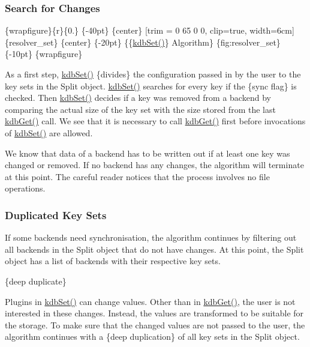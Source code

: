 \subsubsection*{Search for Changes}

\{wrapfigure\}\{r\}\{0.\} \{-\/40pt\} \{center\} \mbox{[}trim = 0 65 0 0, clip=true, width=6cm\mbox{]}\{resolver\+\_\+set\} \{center\} \{-\/20pt\} \{\{\hyperlink{group__kdb_ga11436b058408f83d303ca5e996832bcf}{kdb\+Set()}\} Algorithm\} \{fig\+:resolver\+\_\+set\} \{-\/10pt\} \{wrapfigure\}

As a first step, {\ttfamily \hyperlink{group__kdb_ga11436b058408f83d303ca5e996832bcf}{kdb\+Set()}} \{divides\} the configuration passed in by the user to the key sets in the {\ttfamily Split} object. {\ttfamily \hyperlink{group__kdb_ga11436b058408f83d303ca5e996832bcf}{kdb\+Set()}} searches for every key if the \{sync flag\} is checked. Then {\ttfamily \hyperlink{group__kdb_ga11436b058408f83d303ca5e996832bcf}{kdb\+Set()}} decides if a key was removed from a backend by comparing the actual size of the key set with the size stored from the last {\ttfamily \hyperlink{group__kdb_ga28e385fd9cb7ccfe0b2f1ed2f62453a1}{kdb\+Get()}} call. We see that it is necessary to call {\ttfamily \hyperlink{group__kdb_ga28e385fd9cb7ccfe0b2f1ed2f62453a1}{kdb\+Get()}} first before invocations of {\ttfamily \hyperlink{group__kdb_ga11436b058408f83d303ca5e996832bcf}{kdb\+Set()}} are allowed.

We know that data of a backend has to be written out if at least one key was changed or removed. If no backend has any changes, the algorithm will terminate at this point. The careful reader notices that the process involves no file operations.

\subsubsection*{Duplicated Key Sets}

If some backends need synchronisation, the algorithm continues by filtering out all backends in the {\ttfamily Split} object that do not have changes. At this point, the {\ttfamily Split} object has a list of backends with their respective key sets.

\{deep duplicate\}

Plugins in {\ttfamily \hyperlink{group__kdb_ga11436b058408f83d303ca5e996832bcf}{kdb\+Set()}} can change values. Other than in {\ttfamily \hyperlink{group__kdb_ga28e385fd9cb7ccfe0b2f1ed2f62453a1}{kdb\+Get()}}, the user is not interested in these changes. Instead, the values are transformed to be suitable for the storage. To make sure that the changed values are not passed to the user, the algorithm continues with a \{deep duplication\} of all key sets in the {\ttfamily Split} object.

